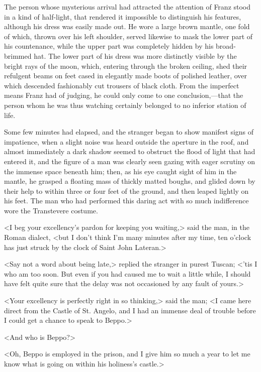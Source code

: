  The person whose mysterious arrival had attracted the attention of Franz stood in a kind of half-light, that rendered it impossible to distinguish his features, although his dress was easily made out. He wore a large brown mantle, one fold of which, thrown over his left shoulder, served likewise to mask the lower part of his countenance, while the upper part was completely hidden by his broad-brimmed hat. The lower part of his dress was more distinctly visible by the bright rays of the moon, which, entering through the broken ceiling, shed their refulgent beams on feet cased in elegantly made boots of polished leather, over which descended fashionably cut trousers of black cloth.  From the imperfect means Franz had of judging, he could only come to one conclusion,—that the person whom he was thus watching certainly belonged to no inferior station of life. 

 Some few minutes had elapsed, and the stranger began to show manifest signs of impatience, when a slight noise was heard outside the aperture in the roof, and almost immediately a dark shadow seemed to obstruct the flood of light that had entered it, and the figure of a man was clearly seen gazing with eager scrutiny on the immense space beneath him; then, as his eye caught sight of him in the mantle, he grasped a floating mass of thickly matted boughs, and glided down by their help to within three or four feet of the ground, and then leaped lightly on his feet. The man who had performed this daring act with so much indifference wore the Transtevere costume. 

 <I beg your excellency's pardon for keeping you waiting,> said the man, in the Roman dialect, <but I don't think I'm many minutes after my time, ten o'clock has just struck by the clock of Saint John Lateran.> 

 <Say not a word about being late,> replied the stranger in purest Tuscan; <'tis I who am too soon. But even if you had caused me to wait a little while, I should have felt quite sure that the delay was not occasioned by any fault of yours.> 

 <Your excellency is perfectly right in so thinking,> said the man; <I came here direct from the Castle of St. Angelo, and I had an immense deal of trouble before I could get a chance to speak to Beppo.> 

 <And who is Beppo?> 

 <Oh, Beppo is employed in the prison, and I give him so much a year to let me know what is going on within his holiness's castle.> 

